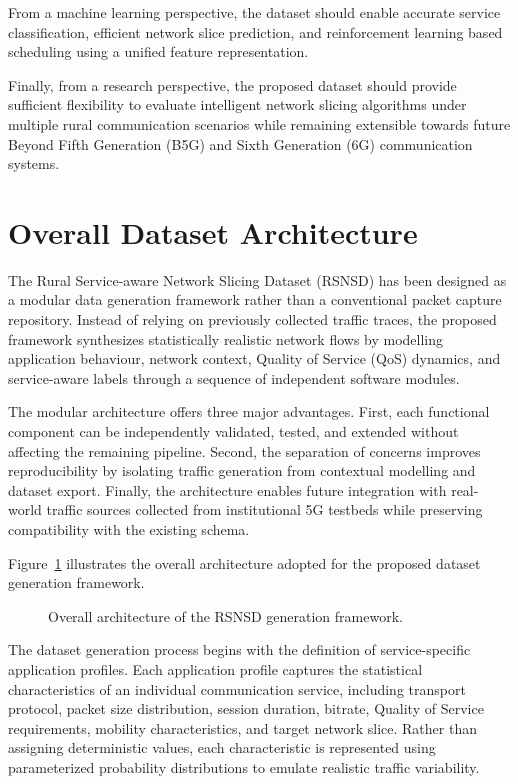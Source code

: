 \documentclass[12pt,a4paper]{article}
\begin{document}
From a machine learning perspective, the dataset should enable accurate service classification, efficient network slice prediction, and reinforcement learning based scheduling using a unified feature representation.

Finally, from a research perspective, the proposed dataset should provide sufficient flexibility to evaluate intelligent network slicing algorithms under multiple rural communication scenarios while remaining extensible towards future Beyond Fifth Generation (B5G) and Sixth Generation (6G) communication systems.

\section{Overall Dataset Architecture}

The Rural Service-aware Network Slicing Dataset (RSNSD) has been designed as a modular data generation framework rather than a conventional packet capture repository. Instead of relying on previously collected traffic traces, the proposed framework synthesizes statistically realistic network flows by modelling application behaviour, network context, Quality of Service (QoS) dynamics, and service-aware labels through a sequence of independent software modules.

The modular architecture offers three major advantages. First, each functional component can be independently validated, tested, and extended without affecting the remaining pipeline. Second, the separation of concerns improves reproducibility by isolating traffic generation from contextual modelling and dataset export. Finally, the architecture enables future integration with real-world traffic sources collected from institutional 5G testbeds while preserving compatibility with the existing schema.

Figure~\ref{fig:dataset_architecture} illustrates the overall architecture adopted for the proposed dataset generation framework.

\begin{figure}[H]
	\centering
	\caption{Overall architecture of the RSNSD generation framework.}
	\label{fig:dataset_architecture}
\end{figure}

The dataset generation process begins with the definition of service-specific application profiles. Each application profile captures the statistical characteristics of an individual communication service, including transport protocol, packet size distribution, session duration, bitrate, Quality of Service requirements, mobility characteristics, and target network slice. Rather than assigning deterministic values, each characteristic is represented using parameterized probability distributions to emulate realistic traffic variability.
\end{document}
